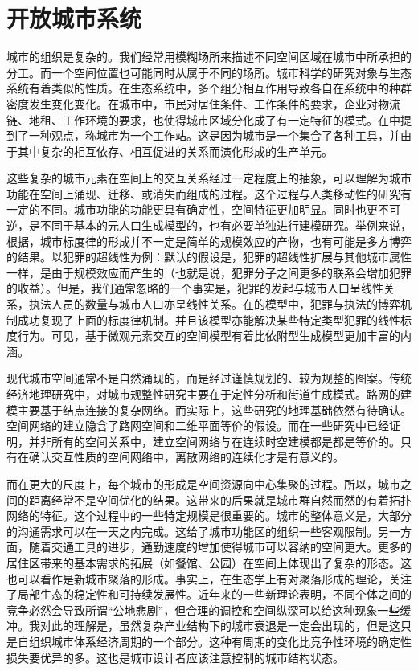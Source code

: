 \chapter{开放城市系统}

城市的组织是复杂的。我们经常用模糊场所来描述不同空间区域在城市中所承担的分工。而一个空间位置也可能同时从属于不同的场所。城市科学的研究对象与生态系统有着类似的性质。在生态系统中，多个组分相互作用导致各自在系统中的种群密度发生变化变化。在城市中，市民对居住条件、工作条件的要求，企业对物流链、地租、工作环境的要求，也使得城市区域分化成了有一定特征的模式。在\cite{christopherson1986city}中提到了一种观点，称城市为一个工作站。这是因为城市是一个集合了各种工具，并由于其中复杂的相互依存、相互促进的关系而演化形成的生产单元。

这些复杂的城市元素在空间上的交互关系经过一定程度上的抽象，可以理解为城市功能在空间上涌现、迁移、或消失而组成的过程。这个过程与人类移动性\cite{molas2017field,gonzalez2008understanding,song2010limits,song2010modelling}的研究有一定的不同。城市功能的功能更具有确定性，空间特征更加明显。同时也更不可逆，是不同于基本的元人口生成模型的，也有必要单独进行建模研究。举例来说，根据\cite{banerjee2015competitive}，城市标度律的形成并不一定是简单的规模效应的产物，也有可能是多方博弈的结果。以犯罪的超线性为例：默认的假设是，犯罪的超线性扩展与其他城市属性一样，是由于规模效应而产生的（也就是说，犯罪分子之间更多的联系会增加犯罪的收益）。但是，我们通常忽略的一个事实是，犯罪的发起与城市人口呈线性关系，执法人员的数量与城市人口亦呈线性关系。在\cite{banerjee2015competitive}的模型中，犯罪与执法的博弈机制成功复现了上面的标度律机制。并且该模型亦能解决某些特定类型犯罪的线性标度行为。可见，基于微观元素交互的空间模型有着比依附型生成模型更加丰富的内涵。

现代城市空间通常不是自然涌现的，而是经过谨慎规划的、较为规整的图案。传统经济地理研究中，对城市规整性研究主要在于定性分析\cite{colonna2002proposal}和街道生成模式\cite{barthelemy2008modeling}。路网的建模主要基于结点连接的复杂网络。而实际上，这些研究的地理基础依然有待确认。空间网络的建立隐含了路网空间和二维平面等价的假设。而在一些研究中\cite{DURRETT1994363}已经证明，并非所有的空间关系中，建立空间网络与在连续时空建模都是都是等价的。只有在确认交互性质的空间网络中，离散网络的连续化才是有意义的。

而在更大的尺度上，每个城市的形成是空间资源向中心集聚的过程。所以，城市之间的距离经常不是空间优化的结果。这带来的后果就是城市群自然而然的有着拓扑网络的特征。这个过程中的一些特定规模是很重要的。城市的整体意义是，大部分的沟通需求可以在一天之内完成。这给了城市功能区的组织一些客观限制\cite{schwanen2002travel,gordon1989influence}。另一方面，随着交通工具的进步，通勤速度的增加使得城市可以容纳的空间更大。更多的居住区带来的基本需求的拓展（如餐馆、公园）在空间上体现出了复杂的形态。这也可以看作是新城市聚落的形成。事实上，在生态学上有对聚落形成的理论，关注了局部生态的稳定性和可持续发展性\cite{nowak1992evolutionary}。近年来的一些新理论\cite{PhysRevLett.122.148102}表明，不同个体之间的竞争必然会导致所谓“公地悲剧”\cite{hardin1968tragedy}，但合理的调控和空间纵深可以给这种现象一些缓冲。我对此的理解是，虽然复杂产业结构下的城市衰退是一定会出现的，但是这只是自组织城市体系经济周期的一个部分。这种有周期的变化比竞争性环境的确定性损失要优异的多。这也是城市设计者应该注意控制的城市结构状态。


